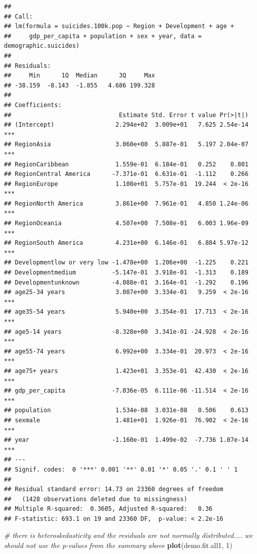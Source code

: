 \documentclass[11pt,]{article}
\newenvironment{Shaded}{\begin{snugshade}}{\end{snugshade}}
\newcommand{\CommentTok}[1]{\textcolor[rgb]{0.56,0.35,0.01}{\textit{#1}}}
\newcommand{\DecValTok}[1]{\textcolor[rgb]{0.00,0.00,0.81}{#1}}
\newcommand{\KeywordTok}[1]{\textcolor[rgb]{0.13,0.29,0.53}{\textbf{#1}}}
\newcommand{\NormalTok}[1]{#1}
\begin{document}
\begin{verbatim}
## 
## Call:
## lm(formula = suicides.100k.pop ~ Region + Development + age + 
##     gdp_per_capita + population + sex + year, data = demographic.suicides)
## 
## Residuals:
##     Min      1Q  Median      3Q     Max 
## -38.159  -8.143  -1.855   4.686 199.328 
## 
## Coefficients:
##                              Estimate Std. Error t value Pr(>|t|)    
## (Intercept)                 2.294e+02  3.009e+01   7.625 2.54e-14 ***
## RegionAsia                  3.060e+00  5.887e-01   5.197 2.04e-07 ***
## RegionCaribbean             1.559e-01  6.184e-01   0.252    0.801    
## RegionCentral America      -7.371e-01  6.631e-01  -1.112    0.266    
## RegionEurope                1.108e+01  5.757e-01  19.244  < 2e-16 ***
## RegionNorth America         3.861e+00  7.961e-01   4.850 1.24e-06 ***
## RegionOceania               4.507e+00  7.508e-01   6.003 1.96e-09 ***
## RegionSouth America         4.231e+00  6.146e-01   6.884 5.97e-12 ***
## Developmentlow or very low -1.478e+00  1.206e+00  -1.225    0.221    
## Developmentmedium          -5.147e-01  3.918e-01  -1.313    0.189    
## Developmentunknown         -4.088e-01  3.164e-01  -1.292    0.196    
## age25-34 years              3.087e+00  3.334e-01   9.259  < 2e-16 ***
## age35-54 years              5.940e+00  3.354e-01  17.713  < 2e-16 ***
## age5-14 years              -8.328e+00  3.341e-01 -24.928  < 2e-16 ***
## age55-74 years              6.992e+00  3.334e-01  20.973  < 2e-16 ***
## age75+ years                1.423e+01  3.353e-01  42.430  < 2e-16 ***
## gdp_per_capita             -7.036e-05  6.111e-06 -11.514  < 2e-16 ***
## population                  1.534e-08  3.031e-08   0.506    0.613    
## sexmale                     1.481e+01  1.926e-01  76.902  < 2e-16 ***
## year                       -1.160e-01  1.499e-02  -7.736 1.07e-14 ***
## ---
## Signif. codes:  0 '***' 0.001 '**' 0.01 '*' 0.05 '.' 0.1 ' ' 1
## 
## Residual standard error: 14.73 on 23360 degrees of freedom
##   (1428 observations deleted due to missingness)
## Multiple R-squared:  0.3605, Adjusted R-squared:   0.36 
## F-statistic: 693.1 on 19 and 23360 DF,  p-value: < 2.2e-16
\end{verbatim}

\begin{Shaded}
\begin{Highlighting}[]
\CommentTok{# there is heteroskedasticity and the residuals are not normally distributed.... we should not use the p-values from the summary above}
\KeywordTok{plot}\NormalTok{(demo.fit.all1, }\DecValTok{1}\NormalTok{)}
\end{Highlighting}
\end{Shaded}
\end{document}
